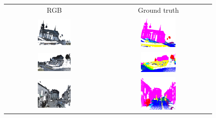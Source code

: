 \begin{figure}
    \centering
    \begin{tabular}{cc}
        RGB & Ground truth \\
        \includegraphics[width=0.35\textwidth, height=0.15\textheight]{images/sem3d_data/1.png} & \includegraphics[width=0.35\textwidth, height=0.15\textheight]{images/sem3d_data/1_gt.png}\\
        \includegraphics[width=0.35\textwidth, height=0.15\textheight]{images/sem3d_data/2.png} & \includegraphics[width=0.35\textwidth, height=0.15\textheight]{images/sem3d_data/2_gt.png}\\
        \includegraphics[width=0.35\textwidth, height=0.15\textheight]{images/sem3d_data/3.png} & \includegraphics[width=0.35\textwidth, height=0.15\textheight]{images/sem3d_data/3_gt.png}\\

\end{tabular}
\end{figure}
